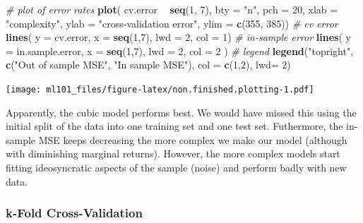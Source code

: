 \documentclass[]{article}
\newenvironment{Shaded}{\begin{snugshade}}{\end{snugshade}}
\newcommand{\CommentTok}[1]{\textcolor[rgb]{0.56,0.35,0.01}{\textit{#1}}}
\newcommand{\DataTypeTok}[1]{\textcolor[rgb]{0.13,0.29,0.53}{#1}}
\newcommand{\DecValTok}[1]{\textcolor[rgb]{0.00,0.00,0.81}{#1}}
\newcommand{\KeywordTok}[1]{\textcolor[rgb]{0.13,0.29,0.53}{\textbf{#1}}}
\newcommand{\NormalTok}[1]{#1}
\newcommand{\OperatorTok}[1]{\textcolor[rgb]{0.81,0.36,0.00}{\textbf{#1}}}
\newcommand{\StringTok}[1]{\textcolor[rgb]{0.31,0.60,0.02}{#1}}
\begin{document}
\begin{Shaded}
\begin{Highlighting}[]
\CommentTok{# plot of error rates}
\KeywordTok{plot}\NormalTok{( cv.error }\OperatorTok{~}\StringTok{ }\KeywordTok{seq}\NormalTok{(}\DecValTok{1}\NormalTok{, }\DecValTok{7}\NormalTok{), }\DataTypeTok{bty =} \StringTok{"n"}\NormalTok{, }\DataTypeTok{pch =} \DecValTok{20}\NormalTok{,}
      \DataTypeTok{xlab =} \StringTok{"complexity"}\NormalTok{, }\DataTypeTok{ylab =} \StringTok{"cross-validation error"}\NormalTok{,}
      \DataTypeTok{ylim =} \KeywordTok{c}\NormalTok{(}\DecValTok{355}\NormalTok{, }\DecValTok{385}\NormalTok{))}
\CommentTok{# cv error}
\KeywordTok{lines}\NormalTok{( }\DataTypeTok{y =}\NormalTok{ cv.error, }\DataTypeTok{x =} \KeywordTok{seq}\NormalTok{(}\DecValTok{1}\NormalTok{,}\DecValTok{7}\NormalTok{), }\DataTypeTok{lwd =} \DecValTok{2}\NormalTok{, }\DataTypeTok{col =} \DecValTok{1}\NormalTok{)}
\CommentTok{# in-sample error}
\KeywordTok{lines}\NormalTok{( }\DataTypeTok{y =}\NormalTok{ in.sample.error, }\DataTypeTok{x =} \KeywordTok{seq}\NormalTok{(}\DecValTok{1}\NormalTok{,}\DecValTok{7}\NormalTok{), }\DataTypeTok{lwd =} \DecValTok{2}\NormalTok{, }\DataTypeTok{col =} \DecValTok{2}\NormalTok{ )}
\CommentTok{# legend}
\KeywordTok{legend}\NormalTok{(}\StringTok{"topright"}\NormalTok{, }\KeywordTok{c}\NormalTok{(}\StringTok{"Out of sample MSE"}\NormalTok{, }\StringTok{"In sample MSE"}\NormalTok{), }\DataTypeTok{col =} \KeywordTok{c}\NormalTok{(}\DecValTok{1}\NormalTok{,}\DecValTok{2}\NormalTok{), }\DataTypeTok{lwd=} \DecValTok{2}\NormalTok{)}
\end{Highlighting}
\end{Shaded}

\texttt{[image: ml101\_files/figure-latex/non.finished.plotting-1.pdf]}

Apparently, the cubic model performs best. We would have missed this using the initial split of the data into one training set and one test set. Futhermore, the in-sample MSE keeps decreasing the more complex we make our model (although with diminishing marginal returns). However, the more complex models start fitting ideosyncratic aspects of the sample (noise) and perform badly with new data.

\hypertarget{k-fold-cross-validation}{%
\subsubsection{k-Fold Cross-Validation}\label{k-fold-cross-validation}}
\end{document}

